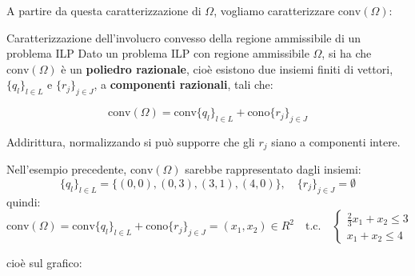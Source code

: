 \documentclass[a4paper,11pt]{article}
\begin{document}
A partire da questa caratterizzazione di $\Omega$, vogliamo caratterizzare $\mathrm{conv} (\Omega)$:

\begin{theorem}{Caratterizzazione dell'involucro convesso della regione ammissibile di un problema ILP}
	Dato un problema ILP con regione ammissibile $\Omega$, si ha che $\mathrm{conv}(\Omega)$ è un \textbf{poliedro razionale}, cioè esistono due insiemi finiti di vettori, $\{ q_l \}_{l \in L}$ e $\{ r_j \}_{j \in J}$, a \textbf{componenti razionali}, tali che:

$$
\mathrm{conv}(\Omega) = \mathrm{conv} \{ q_l \}_{l \in L} + \mathrm{cono} \{ r_j \}_{j \in J}
$$

\end{theorem}

Addirittura, normalizzando si può supporre che gli $r_j$ siano a componenti intere.

Nell'esempio precedente, $\mathrm{conv} (\Omega)$ sarebbe rappresentato dagli insiemi: 
$$
	\{ q_l \}_{l \in L} = \{ (0,0), (0,3), (3,1), (4,0) \}, \quad \{ r_j \}_{j \in J} = \emptyset 
$$
quindi:
$$
\mathrm{conv}(\Omega) = \mathrm{conv} \{ q_l \}_{l \in L} + \mathrm{cono} \{ r_j \}_{j \in J} = (x_1, x_2) \in{R^2} \quad  \text{t.c.} \quad
	\begin{cases}
		\frac{2}{3}x_1 + x_2 \leq 3 \\ 
		x_1 +x_2 \leq 4
	\end{cases}
$$

cioè sul grafico:

\begin{center}


\end{center}
\end{document}
